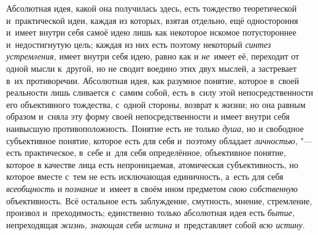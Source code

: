 Абсолютная идея, какой она получилась здесь, есть тождество
теоретической и~практической идеи, каждая из которых, взятая отдельно, ещё
одностороння и~имеет внутри себя самоё идею лишь как некоторое искомое
потустороннее и~недостигнутую цель; каждая из них есть поэтому некоторый
{\em синтез устремления,}
имеет внутри себя идею, равно как и
{\em не}~имеет её,
переходит от одной мысли к~другой, но не сводит воедино этих двух мыслей, а
застревает в~их противоречии. Абсолютная идея, как разумное понятие,
которое в~своей реальности лишь сливается с~самим собой, есть в~силу этой
непосредственности его объективного тождества, с~одной стороны, возврат к
жизни; но она равным образом и~сняла эту форму своей непосредственности и
имеет внутри себя наивысшую противоположность. Понятие есть не только
{\em душа,} но и
свободное субъективное понятие, которое есть для себя и~поэтому обладает
{\em личностью,} "--- есть
практическое, в~себе и~для себя определённое, объективное понятие, которое
в качестве лица есть непроницаемая, атомическая субъективность, но которое
вместе с~тем не есть исключающая единичность, а~есть для себя
{\em всеобщность} и
{\em познание} и~имеет в
своём ином предметом {\em свою
собственную} объективность. Всё остальное есть заблуждение,
смутность, мнение, стремление, произвол и~преходимость; единственно только
абсолютная идея есть {\em бытие,}
непреходящая {\em жизнь,
знающая себя истина} и~представляет собой
{\em всю истину}.

